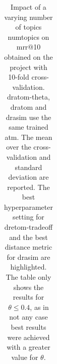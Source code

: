 \begin{table}
    \centering
    \scriptsize
    \caption[Impact of a varying number of topics \gls{numtopics} on \acrshort{mrr@10}]
    {
        Impact of a varying number of topics \gls{numtopics}
        on \acrshort{mrr@10} obtained on the \mozff{} project with 10-fold cross-validation.
        \gls{dratom-theta}, \gls{dratom} and \gls{drasim} use the same trained \gls{atm}.
        The mean over the cross-validation and standard deviation are reported.
        The best hyperparameter setting for \gls{dretom-tradeoff}
        and the best distance metric for \gls{drasim} are highlighted. The table only shows the results for $\theta \le 0.4$, as in not any case best results were achieved with a greater value for $\theta$.
    }
    \label{tab:exp6-mozilla-firefox-20-30-40-50-60-mrr@10}
    \begin{tabular}{ccccccccccccc}
    \toprule
                                                                      

\end{tabular}
\end{table}
